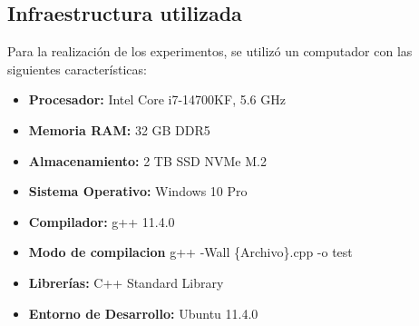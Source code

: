 
\subsection{Infraestructura utilizada}

Para la realización de los experimentos, se utilizó un computador con las siguientes características:

\begin{itemize}
    \item \textbf{Procesador:} Intel Core i7-14700KF, 5.6 GHz
    \item \textbf{Memoria RAM:} 32 GB DDR5
    \item \textbf{Almacenamiento:} 2 TB SSD NVMe M.2
    \item \textbf{Sistema Operativo:} Windows 10 Pro
    \item \textbf{Compilador:} g++ 11.4.0
    \item \textbf{Modo de compilacion} g++ -Wall \{Archivo\}.cpp -o test
    \item \textbf{Librerías:} C++ Standard Library
    \item \textbf{Entorno de Desarrollo:} Ubuntu 11.4.0 
\end{itemize}

